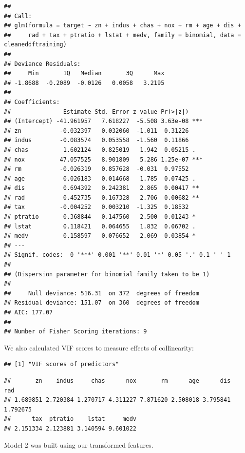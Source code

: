 \documentclass[
]{article}
\begin{document}
\begin{verbatim}
## 
## Call:
## glm(formula = target ~ zn + indus + chas + nox + rm + age + dis + 
##     rad + tax + ptratio + lstat + medv, family = binomial, data = cleaneddftraining)
## 
## Deviance Residuals: 
##     Min       1Q   Median       3Q      Max  
## -1.8688  -0.2089  -0.0126   0.0058   3.2195  
## 
## Coefficients:
##               Estimate Std. Error z value Pr(>|z|)    
## (Intercept) -41.961957   7.618227  -5.508 3.63e-08 ***
## zn           -0.032397   0.032060  -1.011  0.31226    
## indus        -0.083574   0.053558  -1.560  0.11866    
## chas          1.602124   0.825019   1.942  0.05215 .  
## nox          47.057525   8.901809   5.286 1.25e-07 ***
## rm           -0.026319   0.857628  -0.031  0.97552    
## age           0.026183   0.014668   1.785  0.07425 .  
## dis           0.694392   0.242381   2.865  0.00417 ** 
## rad           0.452735   0.167328   2.706  0.00682 ** 
## tax          -0.004252   0.003210  -1.325  0.18532    
## ptratio       0.368844   0.147560   2.500  0.01243 *  
## lstat         0.118421   0.064655   1.832  0.06702 .  
## medv          0.158597   0.076652   2.069  0.03854 *  
## ---
## Signif. codes:  0 '***' 0.001 '**' 0.01 '*' 0.05 '.' 0.1 ' ' 1
## 
## (Dispersion parameter for binomial family taken to be 1)
## 
##     Null deviance: 516.31  on 372  degrees of freedom
## Residual deviance: 151.07  on 360  degrees of freedom
## AIC: 177.07
## 
## Number of Fisher Scoring iterations: 9
\end{verbatim}

We also calculated VIF scores to measure effects of collinearity:

\begin{verbatim}
## [1] "VIF scores of predictors"
\end{verbatim}

\begin{verbatim}
##       zn    indus     chas      nox       rm      age      dis      rad 
## 1.689851 2.720384 1.270717 4.311227 7.871620 2.508018 3.795841 1.792675 
##      tax  ptratio    lstat     medv 
## 2.151334 2.123881 3.140594 9.601022
\end{verbatim}

Model 2 was built using our transformed features.
\end{document}
